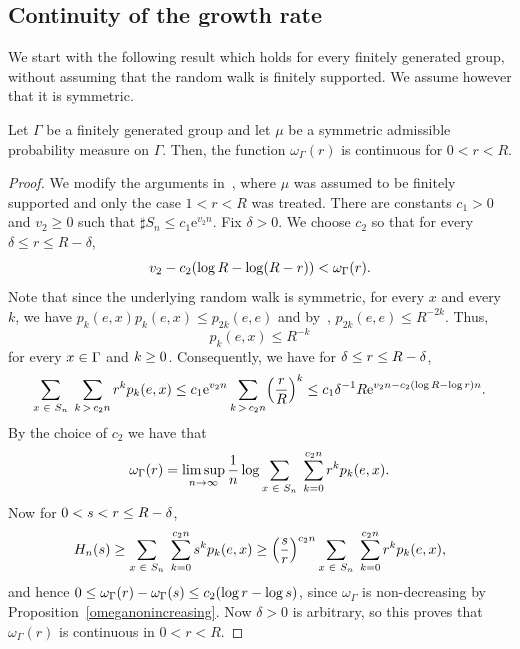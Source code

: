 \documentclass[AHL,Unicode,longabstracts]{cedram}
\newcommand{\rme}{\mathrm{e}}
\let\originalleft\left
\let\originalright\right
\renewcommand{\left}{\mathopen{}\mathclose\bgroup\originalleft}
\renewcommand{\right}{\aftergroup\egroup\originalright}
\let\oldin\in
\renewcommand{\in}{\mathchoice{\oldin}{\oldin}{\,\oldin\,}{\,\oldin\,}}
\let\oldge\ge
\renewcommand{\ge}{\mathchoice{\oldge}{\oldge}{\,\oldge\,}{\,\oldge\,}}
\let\oldle\le
\renewcommand{\le}{\mathchoice{\oldle}{\oldle}{\,\oldle\,}{\,\oldle\,}}
\renewcommand*{\to}{\mathchoice{\longrightarrow}{\rightarrow}{\rightarrow}{\rightarrow}}
\begin{document}
\subsection{Continuity of the growth rate}

We start with the following result which holds for every finitely generated group, without assuming that the random walk is finitely supported. We assume however that it is symmetric.

\begin{prop}\label{omegaGcont}
Let $\Gamma$ be a finitely generated group and let $\mu$ be a symmetric admissible probability measure on $\Gamma$. Then, the function $\omega_{\Gamma}(r)$ is continuous for $0 < r < R$.
\end{prop}


\begin{proof}
We modify the arguments in~\cite[Lemma~3.1]{DWY}, where $\mu$ was assumed to be finitely supported and only the case $1<r<R$ was treated. There are constants $c_1 > 0$ and $v_2 \geq 0$ such that $\sharp S_n \leq c_1 \rme^{v_2 n}$. Fix $\delta > 0$. We choose $c_2$ so that for every $\delta \leq r \leq R - \delta$,
\[
v_2 - c_2 \left(\log R - \log (R - r) \right) < \omega_{\Gamma}(r).
\]
Note that since the underlying random walk is symmetric, for every $x$ and every $k$, we have $p_k(e,x)p_k(e,x)\leq p_{2k}(e,e)$ and by~\cite[Lemma~1.9]{Woessbook}, $p_{2k}(e,e)\leq R^{-2k}$. Thus,
\begin{equation}\label{decayheatkernel}
p_k(e, x) \leq R^{-k}
\end{equation}
for every $x \in \Gamma$ and $k \ge 0$. Consequently, we have for $\delta \le r \le R - \delta$,
\[
\sum_{x \in S_n}\;\sum_{k\,>\,c_2 n} r^k p_k(e, x) \le c_1 \rme^{v_2 n} \sum_{k\,>\,c_2 n} \left(\frac{r}{R} \right)^k \le c_1 \delta^{-1} R \rme^{v_2 n - c_2 \left(\log R - \log r \right) n}.
\]
By the choice of $c_2$ we have that
\[
\omega_{\Gamma}(r) = \limsup_{n \to \infty} \frac{1}{n} \log \sum_{x \in S_n}\;\sum_{k=0}^{c_2 n} r^k p_k(e, x).
\]
Now for $0 < s < r \le R - \delta$,
\[
H_n(s) \geq \sum_{x \in S_n}\;\sum_{k = 0}^{c_2 n} s^k p_k(e, x)
\ge \left(\frac{s}{r} \right)^{c_2 n} \sum_{x \in S_n}\;\sum_{k = 0}^{c_2 n} r^k p_k(e, x),
\]
and hence $0 \leq \omega_{\Gamma}(r) - \omega_\Gamma(s) \le c_2 (\log r - \log s )$, since $\omega_\Gamma$ is non-decreasing by Proposition~\ref{omeganonincreasing}. Now $\delta > 0$ is arbitrary, so this proves that $\omega_{\Gamma}(r)$ is continuous in $0 < r < R$.
\end{proof}
\end{document}
